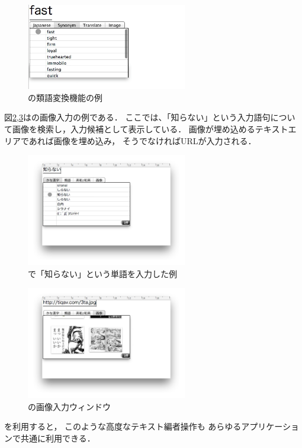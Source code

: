 \begin{figure}[H]
\centerline{\includegraphics[width=70mm,bb=0 0 350 250]{figures/synonym.png}}
\caption{{\system}の類語変換機能の例}
\label{synonym}
\end{figure}

図\ref{image1},\ref{image2}は{\system}の画像入力の例である．
ここでは、「知らない」という入力語句について画像を検索し，入力候補として表示している．
画像が埋め込めるテキストエリアであれば画像を埋め込み，
そうでなければURLが入力される．

\begin{figure}[H]
\centerline{\includegraphics[width=70mm,bb=0 0 600 400]{figures/image1.png}}
\caption{{\system}で「知らない」という単語を入力した例}
\label{image1}
\end{figure}

\begin{figure}[H]
\centerline{\includegraphics[width=70mm,bb=0 0 600 400]{figures/image2.png}}
\caption{{\system}の画像入力ウィンドウ}
\label{image2}
\end{figure}

{\system}を利用すると，
このような高度なテキスト編者操作も
あらゆるアプリケーションで共通に利用できる．

